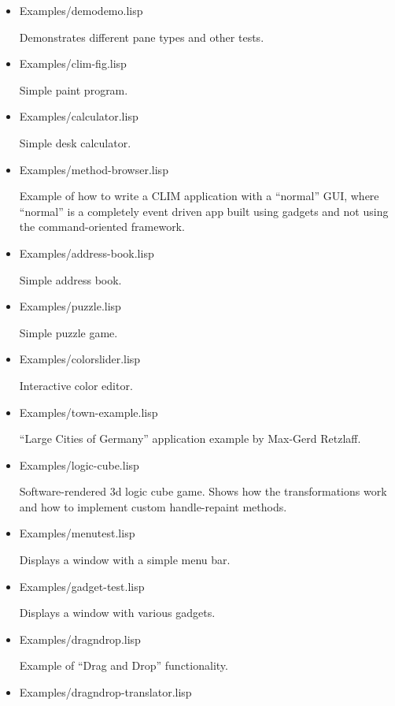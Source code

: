 \begin{itemize}
\item Examples/demodemo.lisp

  Demonstrates different pane types and other tests.

\item Examples/clim-fig.lisp

  Simple paint program.

\item Examples/calculator.lisp

  Simple desk calculator.

\item Examples/method-browser.lisp

  Example of how to write a CLIM application with a ``normal'' GUI,
  where ``normal'' is a completely event driven app built using
  gadgets and not using the command-oriented framework.

\item Examples/address-book.lisp

  Simple address book.

\item Examples/puzzle.lisp

  Simple puzzle game.

\item Examples/colorslider.lisp

  Interactive color editor.

\item Examples/town-example.lisp

  ``Large Cities of Germany'' application example by Max-Gerd Retzlaff.

\item Examples/logic-cube.lisp

  Software-rendered 3d logic cube game. Shows how the transformations
  work and how to implement custom handle-repaint methods.

\item Examples/menutest.lisp

  Displays a window with a simple menu bar.

\item Examples/gadget-test.lisp

  Displays a window with various gadgets.

\item Examples/dragndrop.lisp

  Example of ``Drag and Drop'' functionality.

\item Examples/dragndrop-translator.lisp


\end{itemize}
